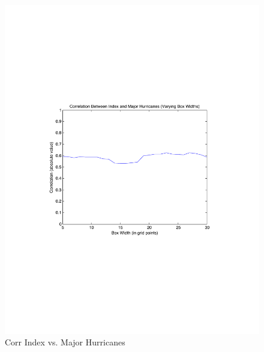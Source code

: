 \documentclass[a4paper,10pt]{article}
\begin{document}
\begin{figure}[ht]
\begin{minipage}[b]{0.6\linewidth}
\includegraphics[width=\textwidth]{figs/sensitivityResults/boxSize/Major_Hurricanes_Index_Box_Size.pdf}
\caption{Corr Index vs. Major Hurricanes}
\label{fig:figure2}
\end{minipage}
\end{figure}
\end{document}

